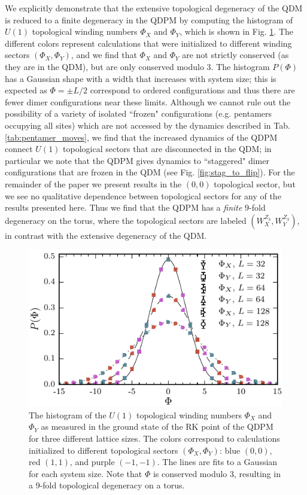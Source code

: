 \documentclass[twocolumn,prb,aps,floatfix,superscriptaddress]{revtex4-1}
\newcommand{\figref}[1]{Fig. \ref{#1}}
\newcommand{\tabref}[1]{Tab. \ref{#1}}
\begin{document}
We explicitly demonstrate that the extensive topological degeneracy of the QDM is reduced to a finite degeneracy in the QDPM by computing the histogram of $U(1)$ topological winding numbers $\Phi_{X}$ and $\Phi_{Y}$, which is shown in \figref{fig:u1_wind_qdpm}. The different colors represent calculations that were initialized to different winding sectors $(\Phi_X,\Phi_Y)$, and we find that $\Phi_X$ and $\Phi_Y$ are not  strictly conserved (as they are in the QDM), but are only conserved modulo $3$. The histogram $P(\Phi)$ has a Gaussian shape with a width that increases with system size; this is expected as $\Phi = \pm L/2$ correspond to ordered configurations and thus there are fewer dimer configurations near these limits. Although we cannot rule out the possibility of a variety of isolated ``frozen" configurations (e.g. pentamers occupying all sites) which are not accessed by the dynamics described in \tabref{tab:pentamer_moves}, we find that the increased dynamics of the QDPM connect $U(1)$ topological sectors that are disconnected in the QDM; in particular we note that the QDPM gives dynamics to ``staggered" dimer configurations that are frozen in the QDM (see \figref{fig:stag_to_flip}). For the remainder of the paper we present results in the $(0,0)$ topological sector, but we see no qualitative dependence between topological sectors for any of the results presented here.  Thus we find that the QDPM has a \emph{finite} $9$-fold degeneracy on the torus, where the topological sectors are labeled $(W_X^{Z_3},W_Y^{Z_3})$, in contrast with the extensive degeneracy of the QDM.

\begin{figure}[]
    \centering
    \includegraphics[width=1.0\linewidth]{u1_wind_qdpm.pdf}
    \caption{The histogram of the $U(1)$ topological winding numbers $\Phi_X$ and $\Phi_Y$ as measured in the ground state of the RK point of the QDPM for three different lattice sizes. The colors correspond to calculations initialized to different topological sectors $(\Phi_X,\Phi_Y)$: blue $(0,0)$, red $(1,1)$, and purple $(-1,-1)$. The lines are fits to a Gaussian for each system size. Note that $\Phi$ is conserved modulo $3$, resulting in a $9$-fold topological degeneracy on a torus.}
    \label{fig:u1_wind_qdpm}
\end{figure}
\end{document}
